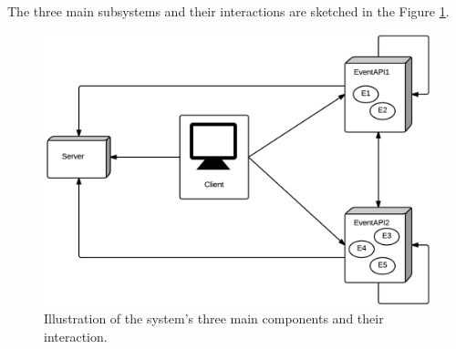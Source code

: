 The three main subsystems and their interactions are sketched in the Figure \ref{fig:ThreeMainSubsystemsSketch}. 

\begin{figure}[h!]
\centering
\includegraphics[width=\linewidth]{Figures/SimplifiedSystemOverview}
\caption{\label{fig:ThreeMainSubsystemsSketch} Illustration of the system's three main components and their interaction.}

\end{figure}